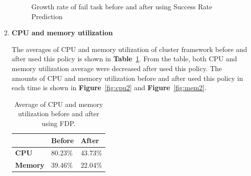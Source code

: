 \documentclass[12pt,oneside,openright,a4paper]{cpe-english-project}
\begin{document}
\begin{enumerate}
\begin{figure}[!h]\centering
    \setlength{\fboxrule}{0mm} %
    \setlength{\fboxsep}{0cm}
    \caption{Growth rate of fail task before and after using Success Rate Prediction}\label{fig:fail2}
\end{figure}

\newpage
  \item \textbf{CPU and memory utilization}

\hspace{10mm}The averages of CPU and memory utilization of cluster framework before and after used this policy is shown in \textbf{Table}~\ref{tbl:po2CPUMem}. From the table, both CPU and memory utilization average were decreased after used this policy. The amounts of CPU and memory utilization before and after used this policy in each time is shown in \textbf{Figure}~\ref{fig:cpu2} and \textbf{Figure}~\ref{fig:mem2}. 
  
  \begin{table}[!h]
  \caption{Average of CPU and memory utilization before and after using FDP.}\label{tbl:po2CPUMem}
  \begin{tabular}{@{}|p{}|p{}|p{}|}
   \hline
   \textbf{} & \textbf{Before} & \textbf{After} \\ 
   \hline
   \textbf{CPU} & 80.23\% & 43.73\% \\ 
   \hline
   \textbf{Memory} & 39.46\% & 22.04\% \\ 
   \hline                     
  \end{tabular}
\end{table}


\end{enumerate}
\end{document}
